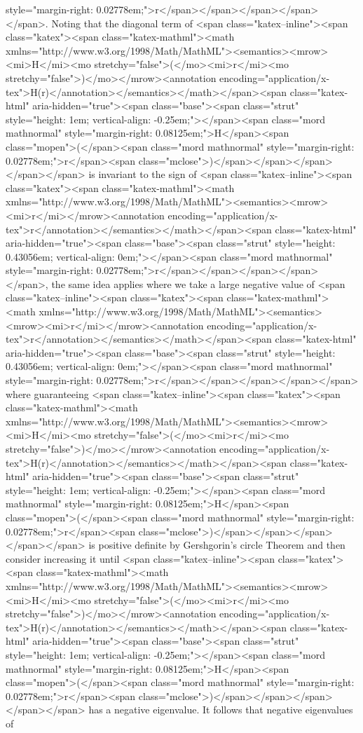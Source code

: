 style="margin-right: 0.02778em;">r</span></span></span></span></span>. Noting that the diagonal term of <span class="katex--inline"><span class="katex"><span class="katex-mathml"><math xmlns="http://www.w3.org/1998/Math/MathML"><semantics><mrow><mi>H</mi><mo stretchy="false">(</mo><mi>r</mi><mo stretchy="false">)</mo></mrow><annotation encoding="application/x-tex">H(r)</annotation></semantics></math></span><span class="katex-html" aria-hidden="true"><span class="base"><span class="strut" style="height: 1em; vertical-align: -0.25em;"></span><span class="mord mathnormal" style="margin-right: 0.08125em;">H</span><span class="mopen">(</span><span class="mord mathnormal" style="margin-right: 0.02778em;">r</span><span class="mclose">)</span></span></span></span></span> is invariant to the sign of <span class="katex--inline"><span class="katex"><span class="katex-mathml"><math xmlns="http://www.w3.org/1998/Math/MathML"><semantics><mrow><mi>r</mi></mrow><annotation encoding="application/x-tex">r</annotation></semantics></math></span><span class="katex-html" aria-hidden="true"><span class="base"><span class="strut" style="height: 0.43056em; vertical-align: 0em;"></span><span class="mord mathnormal" style="margin-right: 0.02778em;">r</span></span></span></span></span>, the same idea applies where we take a large negative value of <span class="katex--inline"><span class="katex"><span class="katex-mathml"><math xmlns="http://www.w3.org/1998/Math/MathML"><semantics><mrow><mi>r</mi></mrow><annotation encoding="application/x-tex">r</annotation></semantics></math></span><span class="katex-html" aria-hidden="true"><span class="base"><span class="strut" style="height: 0.43056em; vertical-align: 0em;"></span><span class="mord mathnormal" style="margin-right: 0.02778em;">r</span></span></span></span></span> where guaranteeing <span class="katex--inline"><span class="katex"><span class="katex-mathml"><math xmlns="http://www.w3.org/1998/Math/MathML"><semantics><mrow><mi>H</mi><mo stretchy="false">(</mo><mi>r</mi><mo stretchy="false">)</mo></mrow><annotation encoding="application/x-tex">H(r)</annotation></semantics></math></span><span class="katex-html" aria-hidden="true"><span class="base"><span class="strut" style="height: 1em; vertical-align: -0.25em;"></span><span class="mord mathnormal" style="margin-right: 0.08125em;">H</span><span class="mopen">(</span><span class="mord mathnormal" style="margin-right: 0.02778em;">r</span><span class="mclose">)</span></span></span></span></span> is positive definite by Gershgorin’s circle Theorem and then consider increasing it until <span class="katex--inline"><span class="katex"><span class="katex-mathml"><math xmlns="http://www.w3.org/1998/Math/MathML"><semantics><mrow><mi>H</mi><mo stretchy="false">(</mo><mi>r</mi><mo stretchy="false">)</mo></mrow><annotation encoding="application/x-tex">H(r)</annotation></semantics></math></span><span class="katex-html" aria-hidden="true"><span class="base"><span class="strut" style="height: 1em; vertical-align: -0.25em;"></span><span class="mord mathnormal" style="margin-right: 0.08125em;">H</span><span class="mopen">(</span><span class="mord mathnormal" style="margin-right: 0.02778em;">r</span><span class="mclose">)</span></span></span></span></span> has a negative eigenvalue. It follows that negative eigenvalues of 